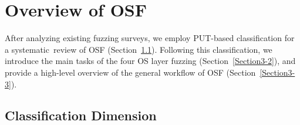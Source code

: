 
\section{Overview of OSF}\label{Section3}

After analyzing existing fuzzing surveys, we employ PUT-based classification for a systematic~review of OSF (Section~\ref{Section3-1}). Following this classification, we introduce the main tasks of the four OS layer fuzzing (Section~\ref{Section3-2}), and provide a high-level overview of the general workflow of OSF (Section~\ref{Section3-3}).

\subsection{Classification Dimension} \label{Section3-1}



